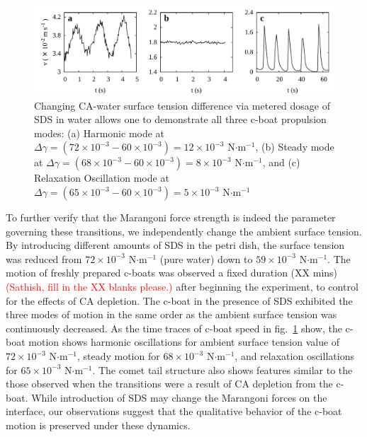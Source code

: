 \documentclass[journal=langd5, manuscript=article, layout=twocolumn]{achemso}
\begin{document}
\begin{figure}[ht] 
    \centering
       \includegraphics[width=\textwidth]{figure4_v2.pdf}
    \caption{Changing CA-water surface tension difference via metered dosage of SDS in water allows one to demonstrate all three c-boat propulsion modes: (a) Harmonic mode at $\Delta \gamma =  (72\times 10^{-3} - 60\times 10^{-3}) = 12\times 10^{-3}$ N$\cdot$m$^{-1}$, (b) Steady mode at $\Delta \gamma =  (68\times 10^{-3} - 60\times 10^{-3}) = 8\times 10^{-3}$ N$\cdot$m$^{-1}$, and (c) Relaxation Oscillation mode at $\Delta \gamma =  (65\times 10^{-3} - 60\times 10^{-3}) = 5\times 10^{-3}$ N$\cdot$m$^{-1}$}
    \label{fig4}
\end{figure}

To further verify that the Marangoni force strength is indeed the parameter governing these transitions, we independently change the ambient surface tension. By introducing different amounts of SDS in the petri dish, the surface tension was reduced from $72\times 10^{-3}$ N$\cdot$m$^{-1}$ (pure water) down to $59\times 10^{-3}$ N$\cdot$m$^{-1}$. The motion of  freshly prepared c-boats was observed a fixed duration (XX mins) \textcolor{red}{(Sathish, fill in the XX blanks please.)} after beginning the experiment, to control for the effects of CA depletion. The c-boat in the presence of SDS exhibited the three modes of motion in the same order as the ambient surface tension was continuously decreased. As the time traces of c-boat speed in fig.~\ref{fig4} show, the c-boat motion shows harmonic oscillations for ambient surface tension value of $72\times 10^{-3}$ N$\cdot$m$^{-1}$, steady motion for $68\times 10^{-3}$ N$\cdot$m$^{-1}$, and relaxation oscillations for $65\times 10^{-3}$ N$\cdot$m$^{-1}$. The comet tail structure also shows features similar to the those observed when the transitions were a result of CA depletion from the c-boat. While introduction of SDS may change the Marangoni forces on the interface, our observations suggest that the qualitative behavior of the c-boat motion is preserved under these dynamics.
\end{document}
